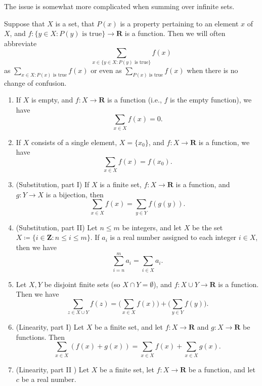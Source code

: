 \begin{remark}\label{7.1.9}
The issue is somewhat more complicated when summing over infinite sets.
\end{remark}

\begin{remark}\label{7.1.10}
Suppose that \(X\) is a set, that \(P(x)\) is a property pertaining to an element \(x\) of \(X\), and \(f : \{y \in X : P(y) \text{ is true}\} \to \mathbf{R}\) is a function.
Then we will often abbreviate
\[
    \sum_{x \in \{y \in X : P(y) \text{ is true}\}} f(x)
\]
as \(\sum_{x \in X : P(x) \text{ is true}} f(x)\) or even as \(\sum_{P(x) \text{ is true}} f(x)\) when there is no change of confusion.
\end{remark}

\begin{proposition}\label{7.1.11}
\mbox{}
    \begin{enumerate}
    \item If \(X\) is empty, and \(f : X \to \mathbf{R}\) is a function (i.e., \(f\) is the empty function), we have
    \[
        \sum_{x \in X} f(x) = 0.
    \]
    \item If \(X\) consists of a single element, \(X = \{x_0\}\), and \(f : X \to \mathbf{R}\) is a function, we have
    \[
        \sum_{x \in X} f(x) = f(x_0).
    \]
    \item (Substitution, part I) If \(X\) is a finite set, \(f : X \to \mathbf{R}\) is a function, and \(g : Y \to X\) is a bijection, then
    \[
        \sum_{x \in X} f(x) = \sum_{y \in Y} f(g(y)).
    \]
    \item (Substitution, part II) Let \(n \leq m\) be integers, and let \(X\) be the set \(X \coloneqq \{i \in \mathbf{Z} : n \leq i \leq m\}\).
    If \(a_i\) is a real number assigned to each integer \(i \in X\), then we have
    \[
        \sum_{i = n}^m a_i = \sum_{i \in X} a_i.
    \]
    \item Let \(X, Y\) be disjoint finite sets (so \(X \cap Y = \emptyset\)), and \(f : X \cup Y \to \mathbf{R}\) is a function.
    Then we have
    \[
        \sum_{z \in X \cup Y} f(z) = \Bigg(\sum_{x \in X} f(x)\Bigg) + \Bigg(\sum_{y \in Y} f(y)\Bigg).
    \]
    \item (Linearity, part I) Let \(X\) be a finite set, and let \(f : X \to \mathbf{R}\) and \(g : X \to \mathbf{R}\) be functions.
    Then
    \[
        \sum_{x \in X} (f(x) + g(x)) = \sum_{x \in X} f(x) + \sum_{x \in X} g(x).
    \]
    \item (Linearity, part II ) Let \(X\) be a finite set, let \(f : X \to \mathbf{R}\) be a function, and let \(c\) be a real number.

\end{enumerate}
\end{proposition}
